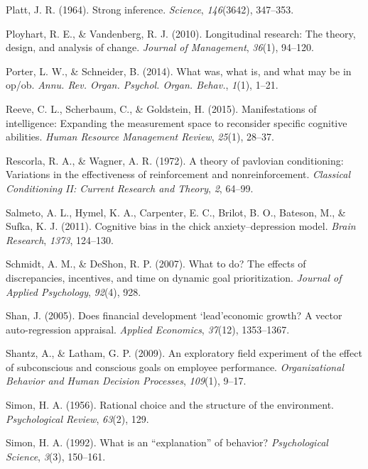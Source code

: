 \documentclass[english,,man]{apa6}
\theoremstyle{definition}
\theoremstyle{definition}
\theoremstyle{definition}
\theoremstyle{remark}
\begin{document}
\leavevmode\hypertarget{ref-platt1964}{}%
Platt, J. R. (1964). Strong inference. \emph{Science}, \emph{146}(3642),
347--353.

\leavevmode\hypertarget{ref-Ployhart2010}{}%
Ployhart, R. E., \& Vandenberg, R. J. (2010). Longitudinal research: The
theory, design, and analysis of change. \emph{Journal of Management},
\emph{36}(1), 94--120.

\leavevmode\hypertarget{ref-porter2014}{}%
Porter, L. W., \& Schneider, B. (2014). What was, what is, and what may
be in op/ob. \emph{Annu. Rev. Organ. Psychol. Organ. Behav.},
\emph{1}(1), 1--21.

\leavevmode\hypertarget{ref-reeve2015}{}%
Reeve, C. L., Scherbaum, C., \& Goldstein, H. (2015). Manifestations of
intelligence: Expanding the measurement space to reconsider specific
cognitive abilities. \emph{Human Resource Management Review},
\emph{25}(1), 28--37.

\leavevmode\hypertarget{ref-rescorla1972}{}%
Rescorla, R. A., \& Wagner, A. R. (1972). A theory of pavlovian
conditioning: Variations in the effectiveness of reinforcement and
nonreinforcement. \emph{Classical Conditioning II: Current Research and
Theory}, \emph{2}, 64--99.

\leavevmode\hypertarget{ref-salmeto2011}{}%
Salmeto, A. L., Hymel, K. A., Carpenter, E. C., Brilot, B. O., Bateson,
M., \& Sufka, K. J. (2011). Cognitive bias in the chick
anxiety--depression model. \emph{Brain Research}, \emph{1373}, 124--130.

\leavevmode\hypertarget{ref-schmidt2007}{}%
Schmidt, A. M., \& DeShon, R. P. (2007). What to do? The effects of
discrepancies, incentives, and time on dynamic goal prioritization.
\emph{Journal of Applied Psychology}, \emph{92}(4), 928.

\leavevmode\hypertarget{ref-shan2005}{}%
Shan, J. (2005). Does financial development `lead'economic growth? A
vector auto-regression appraisal. \emph{Applied Economics},
\emph{37}(12), 1353--1367.

\leavevmode\hypertarget{ref-shantz2009}{}%
Shantz, A., \& Latham, G. P. (2009). An exploratory field experiment of
the effect of subconscious and conscious goals on employee performance.
\emph{Organizational Behavior and Human Decision Processes},
\emph{109}(1), 9--17.

\leavevmode\hypertarget{ref-simon1956}{}%
Simon, H. A. (1956). Rational choice and the structure of the
environment. \emph{Psychological Review}, \emph{63}(2), 129.

\leavevmode\hypertarget{ref-simon1992}{}%
Simon, H. A. (1992). What is an ``explanation'' of behavior?
\emph{Psychological Science}, \emph{3}(3), 150--161.
\end{document}
